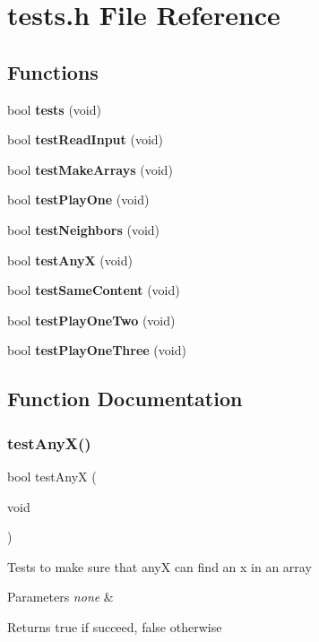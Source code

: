 \section{tests.\+h File Reference}
\label{tests_8h}
\subsection*{Functions}
\begin{DoxyCompactItemize}
\item 
bool \textbf{ tests} (void)
\item 
bool \textbf{ test\+Read\+Input} (void)
\item 
bool \textbf{ test\+Make\+Arrays} (void)
\item 
bool \textbf{ test\+Play\+One} (void)
\item 
bool \textbf{ test\+Neighbors} (void)
\item 
bool \textbf{ test\+AnyX} (void)
\item 
bool \textbf{ test\+Same\+Content} (void)
\item 
bool \textbf{ test\+Play\+One\+Two} (void)
\item 
bool \textbf{ test\+Play\+One\+Three} (void)
\end{DoxyCompactItemize}


\subsection{Function Documentation}
\mbox{\label{tests_8h_a9136792bde961164c06bcdde7ab1d5f5}} 
\subsubsection{test\+Any\+X()}
{\footnotesize\ttfamily bool test\+AnyX (\begin{DoxyParamCaption}\item[{void}]{ }\end{DoxyParamCaption})}

Tests to make sure that anyX can find an x in an array 
\begin{DoxyParams}{Parameters}
{\em none} & \\
\hline
\end{DoxyParams}
\begin{DoxyReturn}{Returns}
true if succeed, false otherwise 
\end{DoxyReturn}


